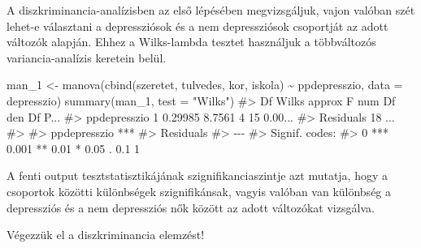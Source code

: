\documentclass[
  letterpaper,
]{krantz}
\makeatletter
\newenvironment{Shaded}{\begin{snugshade}}{\end{snugshade}}
\newcommand{\AttributeTok}[1]{\textcolor[rgb]{0.40,0.45,0.13}{#1}}
\newcommand{\CommentTok}[1]{\textcolor[rgb]{0.37,0.37,0.37}{#1}}
\newcommand{\FunctionTok}[1]{\textcolor[rgb]{0.28,0.35,0.67}{#1}}
\newcommand{\NormalTok}[1]{\textcolor[rgb]{0.00,0.23,0.31}{#1}}
\newcommand{\OtherTok}[1]{\textcolor[rgb]{0.00,0.23,0.31}{#1}}
\newcommand{\SpecialCharTok}[1]{\textcolor[rgb]{0.37,0.37,0.37}{#1}}
\newcommand{\StringTok}[1]{\textcolor[rgb]{0.13,0.47,0.30}{#1}}
\newenvironment{kframe}{%
\medskip{}
\setlength{\fboxsep}{.8em}
 \def\at@end@of@kframe{}%
 \ifinner\ifhmode%
  \def\at@end@of@kframe{\end{minipage}}%
  \begin{minipage}{\columnwidth}%
 \fi\fi%
 \def\FrameCommand##1{\hskip\@totalleftmargin \hskip-\fboxsep
 \colorbox{shadecolor}{##1}\hskip-\fboxsep
     \hskip-\linewidth \hskip-\@totalleftmargin \hskip\columnwidth}%
 \MakeFramed {\advance\hsize-\width
   \@totalleftmargin\z@ \linewidth\hsize
   \@setminipage}}%
 {\par\unskip\endMakeFramed%
 \at@end@of@kframe}
\renewenvironment{Shaded}{\begin{kframe}}{\end{kframe}}
\makeatother
\begin{document}
A diszkriminancia-analízisben az első lépésében megvizsgáljuk, vajon
valóban szét lehet-e választani a depressziósok és a nem depressziósok
csoportját az adott változók alapján. Ehhez a Wilks-lambda tesztet
használjuk a többváltozós variancia-analízis keretein belül.

\begin{Shaded}
\begin{Highlighting}[]
\NormalTok{man\_1 }\OtherTok{\textless{}{-}} \FunctionTok{manova}\NormalTok{(}\FunctionTok{cbind}\NormalTok{(szeretet, tulvedes, kor, iskola) }\SpecialCharTok{\textasciitilde{}}\NormalTok{ ppdepresszio,}
    \AttributeTok{data =}\NormalTok{ depresszio)}
\FunctionTok{summary}\NormalTok{(man\_1, }\AttributeTok{test =} \StringTok{"Wilks"}\NormalTok{)}
\CommentTok{\#\textgreater{}              Df   Wilks approx F num Df den Df    P...}
\CommentTok{\#\textgreater{} ppdepresszio  1 0.29985   8.7561      4     15 0.00...}
\CommentTok{\#\textgreater{} Residuals    18                                    ...}
\CommentTok{\#\textgreater{}                 }
\CommentTok{\#\textgreater{} ppdepresszio ***}
\CommentTok{\#\textgreater{} Residuals       }
\CommentTok{\#\textgreater{} {-}{-}{-}}
\CommentTok{\#\textgreater{} Signif. codes:  }
\CommentTok{\#\textgreater{} 0 \textquotesingle{}***\textquotesingle{} 0.001 \textquotesingle{}**\textquotesingle{} 0.01 \textquotesingle{}*\textquotesingle{} 0.05 \textquotesingle{}.\textquotesingle{} 0.1 \textquotesingle{} \textquotesingle{} 1}
\end{Highlighting}
\end{Shaded}

A fenti output tesztstatisztikájának szignifikanciaszintje azt mutatja,
hogy a csoportok közötti különbségek szignifikánsak, vagyis valóban van
különbség a depressziós és a nem depressziós nők között az adott
változókat vizsgálva.

Végezzük el a diszkriminancia elemzést!
\end{document}
